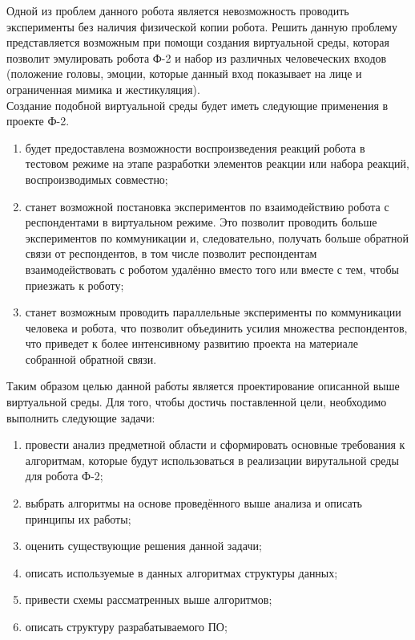 Одной из проблем данного робота является невозможность проводить эксперименты без наличия физической копии робота. Решить данную проблему представляется возможным при помощи создания виртуальной среды, которая позволит эмулировать робота Ф-2 и набор из различных человеческих входов (положение головы, эмоции, которые данный вход показывает на лице и ограниченная мимика и жестикуляция).\\

Создание подобной виртуальной среды будет иметь следующие применения в проекте Ф-2.
\begin{enumerate}
	\item будет предоставлена возможности воспроизведения реакций робота в тестовом режиме на этапе разработки элементов реакции или набора реакций, воспроизводимых совместно;
	\item станет возможной постановка экспериментов по взаимодействию робота с респондентами в виртуальном режиме. Это позволит проводить больше экспериментов по коммуникации и, следовательно, получать больше обратной связи от респондентов, в том числе позволит респондентам взаимодействовать с роботом удалённо вместо того или вместе с тем, чтобы приезжать к роботу;
	\item станет возможным проводить параллельные эксперименты по коммуникации человека и робота, что позволит объединить усилия множества респондентов, что приведет к более интенсивному развитию проекта на материале собранной обратной связи.
\end{enumerate}

Таким образом целью данной работы является проектирование описанной выше виртуальной среды. Для того, чтобы достичь поставленной цели, необходимо выполнить следующие задачи:
\begin{enumerate}
	\item провести анализ предметной области и сформировать основные требования к алгоритмам, которые будут использоваться в реализации вирутальной среды для робота Ф-2;
	\item выбрать алгоритмы на основе проведённого выше анализа и описать принципы их работы;
	\item оценить существующие решения данной задачи;
	\item описать используемые в данных алгоритмах структуры данных;
	\item привести схемы рассматренных выше алгоритмов;
	\item описать структуру разрабатываемого ПО;
\end{enumerate}

